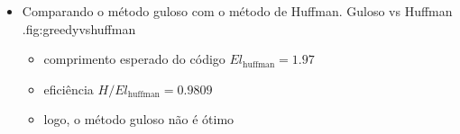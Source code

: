 \begin{frame}[allowframebreaks]
\begin{itemize}
  \item Comparando o método guloso com o método de Huffman.
	{Guloso vs Huffman \citep{bilmes2013}.}{fig:greedyvshuffman}
	\begin{itemize}
        \item comprimento esperado do código $E l_{\text{huffman}} = 1.97$
	\item eficiência $H/E l_{\text{huffman}} = 0.9809$
	\item logo, o método guloso não é ótimo
        \end{itemize}

  \end{itemize}
\end{frame}


